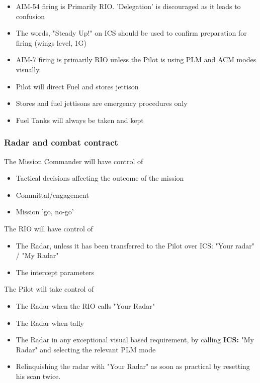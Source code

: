 \begin{itemize}

  \item AIM-54 firing is Primarily RIO. 'Delegation' is discouraged as it leads
    to confusion

  \item The words, "Steady Up!" on ICS should be used to confirm preparation
    for firing (wings level, 1G)

  \item AIM-7 firing is primarily RIO unless the Pilot is using PLM and ACM
    modes visually.

  \item Pilot will direct Fuel and stores jettison

  \item Stores and fuel jettisons are emergency procedures only

  \item Fuel Tanks will always be taken and kept

\end{itemize}

\subsubsection{Radar and combat contract}
\label{sec:radar-and-combat-contract}

The Mission Commander will have control of

\begin{itemize}
  \item Tactical decisions affecting the outcome of the mission
  \item Committal/engagement
  \item Mission 'go, no-go'
\end{itemize}

The RIO will have control of

\begin{itemize}

  \item The Radar, unless it has been transferred to the Pilot over ICS: "Your
  radar" / "My Radar"

  \item The intercept parameters

\end{itemize}

The Pilot will take control of

\begin{itemize}

  \item The Radar when the RIO calls "Your Radar"

  \item The Radar when tally

  \item The Radar in any exceptional visual based requirement, by calling
  \textbf{ICS:} "My Radar" and selecting the relevant PLM mode

  \item Relinquishing the radar with "Your Radar" as soon as practical by
  resetting his scan twice.

\end{itemize}

